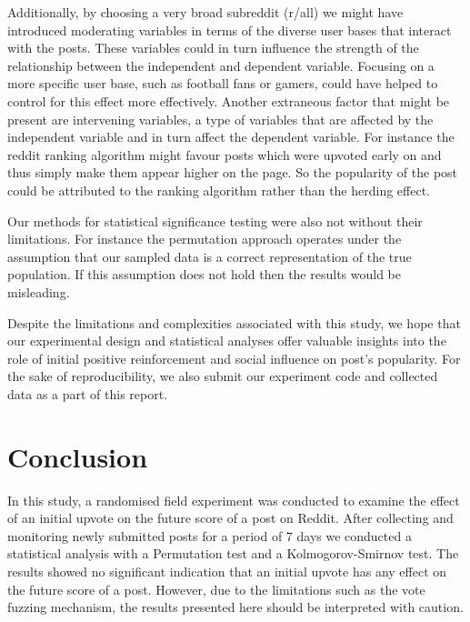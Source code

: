 \documentclass[fleqn,12pt]{article}
\begin{document}
Additionally, by choosing a very broad subreddit (r/all) we might have introduced 
moderating variables in terms of the diverse user bases that interact with the posts. 
These variables
could in turn influence the strength of the relationship between the independent
and dependent variable. Focusing on a more specific user base, such as
football fans or gamers, could have helped to control for this effect more effectively.
Another extraneous factor that might be present are intervening variables, a type of variables that are affected by the independent
variable and in turn affect the dependent variable.
For instance the reddit ranking algorithm might favour posts which were upvoted early on
and thus simply make them appear higher on the page. So the popularity of the post
could be attributed to the ranking algorithm rather than the herding effect. 



Our methods for statistical significance testing were also not without their limitations.
For instance the permutation approach operates under the assumption that our sampled data 
is a correct representation of the true population. If this assumption does not hold
then the results would be misleading.

Despite the limitations and complexities associated with this 
study, we hope that our experimental design and statistical 
analyses offer valuable insights into the role of initial positive reinforcement and social 
influence on post's popularity. For the sake of reproducibility, we also submit 
our experiment code and collected data as a part of this report.


\section{Conclusion}

In this study, a randomised field experiment was conducted to examine the effect of an 
initial upvote on the future score of a post on Reddit. After collecting and monitoring newly submitted posts
for a period of 7 days we conducted a statistical analysis with a Permutation test and a Kolmogorov-Smirnov test.
The results showed no significant indication that an initial upvote has any effect on the future score of a post.
However, due to the limitations such as the vote fuzzing mechanism, the results presented here should be interpreted with caution.



 \newpage 


\end{document}
